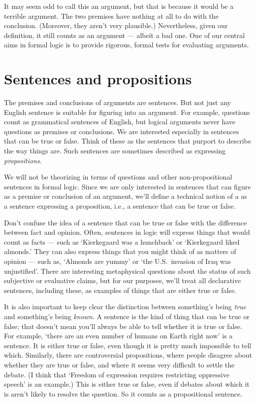 It may seem odd to call this an argument, but that is because it would be a {terrible} argument. The two premises have nothing at all to do with the conclusion. (Moreover, they aren't very plausible.) Nevertheless, given our definition, it still counts as an argument --- albeit a bad one. One of our central aims in formal logic is to provide rigorous, formal tests for evaluating arguments.


\section{Sentences and propositions}
\label{intro.sentences}

The premises and conclusions of arguments are sentences. But not just any English sentence is suitable for figuring into an argument. For example, questions count as grammatical sentences of English, but logical arguments never have questions as premises or conclusions. We are interested especially in sentences that can be true or false. Think of these as the sentences that purport to describe the way things are. Such sentences are sometimes described as expressing \emph{propositions}.

We will not be theorizing in terms of questions and other non-propositional sentences in formal logic. Since we are only interested in sentences that can figure as a premise or conclusion of an argument, we'll define a technical notion of a  as a sentence expressing a proposition, i.e., a sentence that can be true or false.

Don't confuse the idea of a sentence that can be true or false with the difference between fact and opinion. Often, sentences in logic will express things that would count as facts --- such as `Kierkegaard was a hunchback' or `Kierkegaard liked almonds.' They can also express things that you might think of as matters of opinion --- such as, `Almonds are yummy' or `the U.S.\ invasion of Iraq was unjustified'. There are interesting metaphysical questions about the status of such subjective or evaluative claims, but for our purposes, we'll treat all declarative sentences, including these, as examples of things that are either true or false.

It is also important to keep clear the distinction between something's being \emph{true} and something's being \emph{known}. A sentence is the kind of thing that can be true or false; that doesn't mean you'll always be able to tell whether it is true or false. For example, `there are an even number of humans on Earth right now' is a sentence. It is either true or false, even though it is pretty much impossible to tell which. Similarly, there are controversial propositions, where people disagree about whether they are true or false, and where it seems very difficult to settle the debate. (I think that `Freedom of expression requires restricting oppressive speech' is an example.) This is either true or false, even if debates about which it is aren't likely to resolve the question. So it counts as a propositional sentence.


